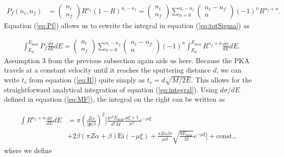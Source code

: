 \documentclass[twoside,twocolumn,9pt]{article}
\begin{document}
\begin{equation}
  \begin{aligned}
    P_f(n_i, n_f)
    &=
    \begin{pmatrix}
      n_i\\n_f
    \end{pmatrix}
    R^{n_f}(1-R)^{n_i - n_f}
    =
    \begin{pmatrix}
      n_i\\n_f
    \end{pmatrix}
    \sum^{n_i-n_f}_{n=0}
    \begin{pmatrix}
      n_i-n_f\\n
    \end{pmatrix}
    (-1)^n R^{n_f+n}.
  \end{aligned}
  \label{eq:Pf}
\end{equation}
%
Equation (\ref{eq:Pf}) allows us to rewrite the integral in equation
(\ref{eq:totSigma}) as

\begin{equation}
  \begin{aligned}
    &\int_{E_d}^{E_\text{max}}
    P_f \frac{d\sigma}{dE} dE
    =
    \begin{pmatrix}
      n_i\\n_f
    \end{pmatrix}
    \sum^{n_i-n_f}_{n=0}
    \begin{pmatrix}
      n_i-n_f\\n
    \end{pmatrix}
    (-1)^n
    \int^{E_\text{max}}_{E_d}
    R^{n_f+n}
    \frac{d\sigma}{dE}
    dE.
  \end{aligned}
  \label{eq:integral}
\end{equation}
%
Assumption 3 from the previous subsection again aids us here.
Because the PKA travels at a constant velocity until it reaches the sputtering
distance $d$, we can write $t_s$ from equation (\ref{eq:R}) quite simply as
$t_s = d\sqrt{M/2E}$.
This allows for the straightforward analytical integration of equation
(\ref{eq:integral}).  Using $d\sigma/dE$ defined in equation (\ref{eq:MF}), the
integral on the right can be written as

\begin{equation}
  \begin{aligned}
    \int R^{n_f+n} \frac{d\sigma}{dE} dE
    &=
    \pi\left(\frac{Z\alpha}{|\mathbf{p}|\beta}\right)^2
    \bigg[
      \frac{4\tau^2 E_\text{max}}{d^2M} \frac{\mu\xi+1}{\mu^2} e^{-\mu\xi}
      \\&+
      2\beta(\pi Z\alpha+\beta)\text{Ei}(-\mu\xi)
      +
      \frac{\pi Z\alpha\beta\tau}{\mu d}\sqrt{\frac{8E_\text{max}}{M}}
      e^{-\mu\xi}
    \bigg]
    +\text{const}.,
  \end{aligned}
  \label{eq:analytical}
\end{equation}
%
where we define
\end{document}
